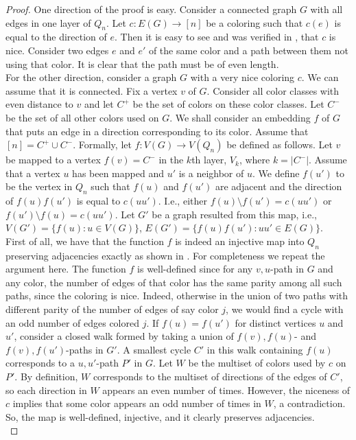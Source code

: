 \documentclass[11pt, a4paper]{article}
\begin{document}
	
	
	\begin{proof}
	One direction of the proof is easy. Consider a connected graph $G$ with all edges in one layer of $Q_n$. 
	Let $c: E(G)\rightarrow [n]$ be a coloring such that $c(e)$ is equal to the direction of $e$.
	Then it is easy to see and was verified in  \cite{HM}, that $c$ is nice. 
	Consider  two edges $e$ and $e'$ of the same color and  a path between them not using that color. It is clear that the path must be of even length. \\
	
	For the other direction, consider a graph $G$ with a very nice coloring $c$. We can assume that it is connected. 
	Fix a vertex $v$ of $G$. Consider all color classes with even distance to $v$ and let $C^+$ be the set of colors on these color classes.  Let $C^-$ be the set of all other colors used on $G$. 
	We shall consider an embedding $f$  of $G$ that puts an edge in a direction corresponding to its color.  Assume that  $[n]=C^+ \cup C^-$. 
	Formally, let $f: V(G) \rightarrow V(Q_n)$ be defined as follows.
	Let $v$ be mapped to a vertex $f(v)= C^-$ in the $k$th layer, $V_k$, where $k= |C^-|$. Assume that a vertex $u$ has been mapped and $u'$ is a neighbor of $u$. We define $f(u')$ 
	to be the vertex in $Q_n$ such that $f(u)$ and $f(u')$ are adjacent and  the direction of $f(u)f(u')$ is equal to $c(uu')$. I.e., either $f(u)\setminus f(u')= c(uu')$ or $f(u') \setminus f(u)= c(uu')$.
  Let $G'$ be a graph resulted from this map, i.e., $V(G') = \{f(u): u\in V(G)\}$, $E(G') = \{f(u)f(u'): uu' \in E(G)\}$.\\
	
	
	 First of all, we have that the function $f$  is indeed an injective map into $Q_n$ preserving adjacencies exactly as  shown in  \cite{HM}. For completeness we repeat the argument here. The function $f$  is well-defined since for any $v,u$-path in $G$ and any color, the number of edges of that color has the same parity  among all such paths, since the coloring is nice.  Indeed, otherwise in the union of two paths with different parity of the number of edges of say color $j$, we would find a cycle with an odd number of edges colored $j$.   If $f(u)=f(u')$ for distinct vertices $u$ and $u'$,  consider a closed walk formed by taking a union of $f(v),f(u)$- and $f(v),f(u')$-paths in $G'$. A smallest cycle $C'$ in this walk containing $f(u)$ corresponds to a $u,u'$-path $P'$  in $G$. Let $W$ be the multiset of colors used by $c$ on $P'$.  By definition, $W$ corresponds to the multiset of directions of the edges of $C'$, so each direction in $W$ appears an even number of times.  However, the niceness of $c$ implies that  some color appears an odd number of times in $W$, a contradiction.
	So, the map is well-defined, injective, and it  clearly preserves adjacencies.\\
	

\end{proof}
\end{document}
